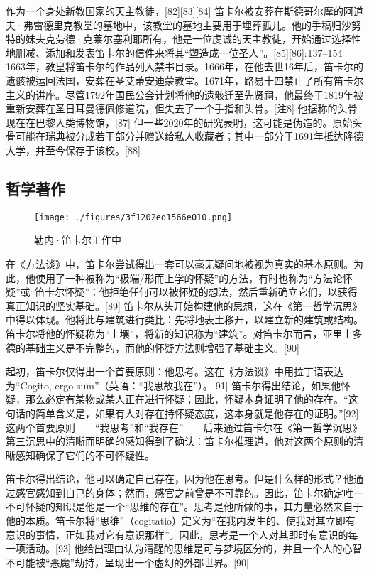 作为一个身处新教国家的天主教徒，[82][83][84] 笛卡尔被安葬在斯德哥尔摩的阿道夫·弗雷德里克教堂的墓地中，该教堂的墓地主要用于埋葬孤儿。他的手稿归沙努特的妹夫克劳德·克莱尔塞利耶所有，他是一位虔诚的天主教徒，开始通过选择性地删减、添加和发表笛卡尔的信件来将其“塑造成一位圣人”。[85][86]: 137–154  1663年，教皇将笛卡尔的作品列入禁书目录。1666年，在他去世16年后，笛卡尔的遗骸被运回法国，安葬在圣艾蒂安迪蒙教堂。1671年，路易十四禁止了所有笛卡尔主义的讲座。尽管1792年国民公会计划将他的遗骸迁至先贤祠，他最终于1819年被重新安葬在圣日耳曼德佩修道院，但失去了一个手指和头骨。[注8] 他据称的头骨现在在巴黎人类博物馆，[87] 但一些2020年的研究表明，这可能是伪造的。原始头骨可能在瑞典被分成若干部分并赠送给私人收藏者；其中一部分于1691年抵达隆德大学，并至今保存于该校。[88]
\subsection{哲学著作}
\begin{figure}[ht]
\centering
\texttt{[image: ./figures/3f1202ed1566e010.png]}
\caption{勒内·笛卡尔工作中} \label{fig_DKE_9}
\end{figure}
在《方法谈》中，笛卡尔尝试得出一套可以毫无疑问地被视为真实的基本原则。为此，他使用了一种被称为“极端/形而上学的怀疑”的方法，有时也称为“方法论怀疑”或“笛卡尔怀疑”：他拒绝任何可以被怀疑的想法，然后重新确立它们，以获得真正知识的坚实基础。[89] 笛卡尔从头开始构建他的思想，这在《第一哲学沉思》中得以体现。他将此与建筑进行类比：先将地表土移开，以建立新的建筑或结构。笛卡尔将他的怀疑称为“土壤”，将新的知识称为“建筑”。对笛卡尔而言，亚里士多德的基础主义是不完整的，而他的怀疑方法则增强了基础主义。[90]

起初，笛卡尔仅得出一个首要原则：他思考。这在《方法谈》中用拉丁语表达为“Cogito, ergo sum”（英语：“我思故我在”）。[91] 笛卡尔得出结论，如果他怀疑，那么必定有某物或某人正在进行怀疑；因此，怀疑本身证明了他的存在。“这句话的简单含义是，如果有人对存在持怀疑态度，这本身就是他存在的证明。”[92] 这两个首要原则——“我思考”和“我存在”——后来通过笛卡尔在《第一哲学沉思》第三沉思中的清晰而明确的感知得到了确认：笛卡尔推理道，他对这两个原则的清晰感知确保了它们的不可怀疑性。

笛卡尔得出结论，他可以确定自己存在，因为他在思考。但是什么样的形式？他通过感官感知到自己的身体；然而，感官之前曾是不可靠的。因此，笛卡尔确定唯一不可怀疑的知识是他是一个“思维的存在”。思考是他所做的事，其力量必然来自于他的本质。笛卡尔将“思维”（cogitatio）定义为“在我内发生的、使我对其立即有意识的事情，正如我对它有意识那样”。因此，思考是一个人对其即时有意识的每一项活动。[93] 他给出理由认为清醒的思维是可与梦境区分的，并且一个人的心智不可能被“恶魔”劫持，呈现出一个虚幻的外部世界。[90]

